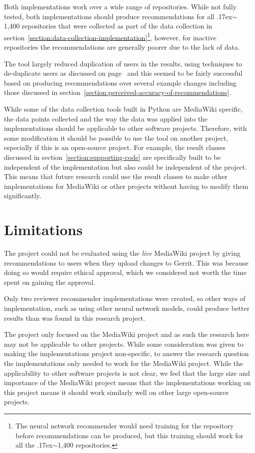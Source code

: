 Both implementations work over a wide range of repositories. While not fully tested, both implementations should produce recommendations for all {\raise.17ex\hbox{$\scriptstyle\sim$}}1,400 repositories that were collected as part of the data collection in section~\ref{section:data-collection-implementation}\footnote{The neural network recommender would need training for the repository before recommendations can be produced, but this training should work for all the {\raise.17ex\hbox{$\scriptstyle\sim$}}1,400 repositories.}, however, for inactive repositories the recommendations are generally poorer due to the lack of data.

The tool largely reduced duplication of users in the results, using techniques to de-duplicate users as discussed on page~\pageref{para:de-duplication-supporting-code} and this seemed to be fairly successful based on producing recommendations over several example changes including those discussed in section~\ref{section:perceived-accuracy-of-recommendations}.

While some of the data collection tools built in Python are MediaWiki specific, the data points collected and the way the data was applied into the implementations should be applicable to other software projects. Therefore, with some modification it should be possible to use the tool on another project, especially if this is an open-source project. For example, the result classes discussed in section~\ref{section:supporting-code} are specifically built to be independent of the implementation but also could be independent of the project. This means that future research could use the result classes to make other implementations for MediaWiki or other projects without having to modify them significantly.

\section{Limitations}
The project could not be evaluated using the \emph{live} MediaWiki project by giving recommendations to users when they upload changes to Gerrit. This was because doing so would require ethical approval, which we considered not worth the time spent on gaining the approval.

Only two reviewer recommender implementations were created, so other ways of implementation, such as using other neural network models, could produce better results than was found in this research project.

The project only focused on the MediaWiki project and as such the research here may not be applicable to other projects. While some consideration was given to making the implementations project non-specific, to answer the research question the implementations only needed to work for the MediaWiki project. While the applicability to other software projects is not clear, we feel that the large size and importance of the MediaWiki project means that the implementations working on this project means it should work similarly well on other large open-source projects.

